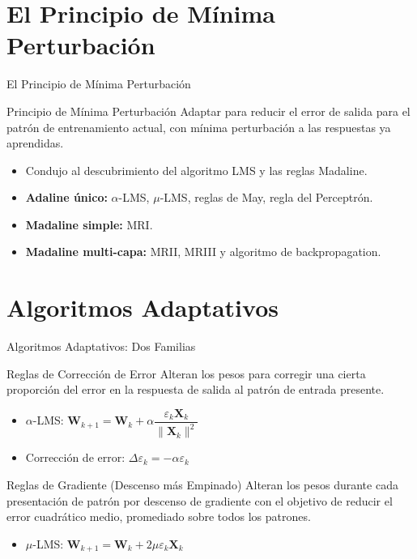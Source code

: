 \documentclass[aspectratio=169,utf8,spanish]{beamer}
\begin{document}
\section{El Principio de Mínima Perturbación}

\begin{frame}{El Principio de Mínima Perturbación}
  \begin{block}{Principio de Mínima Perturbación}
    Adaptar para reducir el error de salida para el patrón de entrenamiento actual, con mínima perturbación a las respuestas ya aprendidas.
  \end{block}

  \begin{itemize}
    \item Condujo al descubrimiento del algoritmo LMS y las reglas Madaline.
    \item \textbf{Adaline único:} $\alpha$-LMS, $\mu$-LMS, reglas de May, regla del Perceptrón.
    \item \textbf{Madaline simple:} MRI.
    \item \textbf{Madaline multi-capa:} MRII, MRIII y algoritmo de backpropagation.
  \end{itemize}
\end{frame}

\section{Algoritmos Adaptativos}

\begin{frame}{Algoritmos Adaptativos: Dos Familias}
  \begin{block}{Reglas de Corrección de Error}
    Alteran los pesos para corregir una cierta proporción del error en la respuesta de salida al patrón de entrada presente.
    \begin{itemize}
      \item $\alpha$-LMS: $\mathbf{W}_{k+1} = \mathbf{W}_k + \alpha \dfrac{\varepsilon_k \mathbf{X}_k}{\|\mathbf{X}_k\|^2}$
      \item Corrección de error: $\Delta\varepsilon_k = -\alpha\varepsilon_k$
    \end{itemize}
  \end{block}

  \begin{block}{Reglas de Gradiente (Descenso más Empinado)}
    Alteran los pesos durante cada presentación de patrón por descenso de gradiente con el objetivo de reducir el error cuadrático medio, promediado sobre todos los patrones.
    \begin{itemize}
      \item $\mu$-LMS: $\mathbf{W}_{k+1} = \mathbf{W}_k + 2\mu\varepsilon_k \mathbf{X}_k$
    \end{itemize}
  \end{block}
\end{frame}
\end{document}
